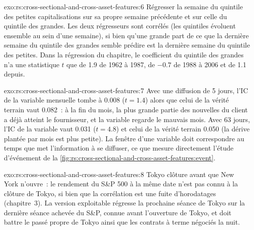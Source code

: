 \begin{solution}{exo:rs:cross-sectional-and-cross-asset-features:6}
Régresser la semaine du quintile des petites capitalisations sur sa propre semaine précédente et sur celle du quintile des grandes. Les deux régresseurs sont corrélés (les quintiles
évoluent ensemble au sein d'une semaine), si bien qu'une grande part de ce que la dernière semaine du quintile des grandes semble prédire est la dernière semaine du quintile des petites. Dans
la régression du chapitre, le coefficient du quintile des grandes n'a une statistique $t$ que de 1.9 de 1962 à 1987, de $-0.7$ de 1988 à 2006
et de 1.1 depuis.
\end{solution}

\begin{solution}{exo:rs:cross-sectional-and-cross-asset-features:7}
Avec une diffusion de 5 jours, l'IC de la variable mensuelle tombe à 0.008 ($t = 1.4$) alors que celui de la vérité terrain vaut 0.082~: à la fin du mois, la plus grande partie des
nouvelles du client a déjà atteint le fournisseur, et la variable regarde le mauvais mois. Avec 63 jours, l'IC de la variable vaut 0.031
($t = 4.8$) et celui de la vérité terrain 0.050 (la dérive plantée par mois est plus petite). La fenêtre d'une variable doit correspondre au temps que met l'information
à se diffuser, ce que mesure directement l'étude d'événement de la \cref{fig:rs:cross-sectional-and-cross-asset-features:event}.
\end{solution}

\begin{solution}{exo:rs:cross-sectional-and-cross-asset-features:8}
Tokyo clôture avant que New York n'ouvre~: le rendement du S\&P 500 à la même date n'est pas connu à la clôture de Tokyo, si bien que la corrélation est une
fuite d'horodatages (chapitre~3). La version exploitable régresse la prochaine séance de Tokyo sur la dernière séance achevée du S\&P, connue avant
l'ouverture de Tokyo, et doit battre le passé propre de Tokyo ainsi que les contrats à terme négociés la nuit.
\end{solution}

